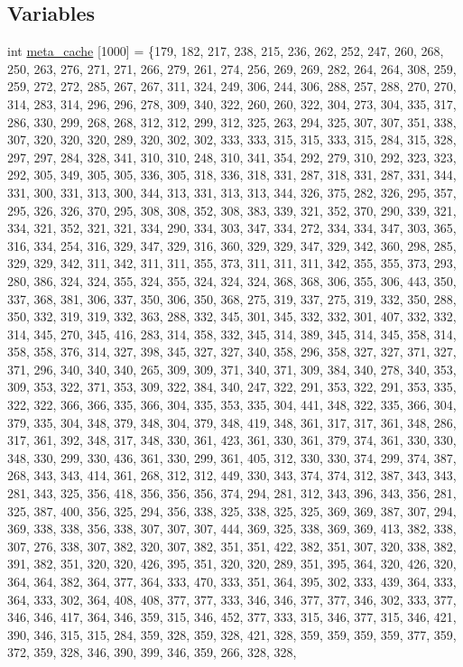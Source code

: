 \subsection*{Variables}
\begin{DoxyCompactItemize}
\item 
int \hyperlink{SphereCollatz_8c_09_09_a3153326b42a60057c079e1910757729a}{meta\-\_\-cache} \mbox{[}1000\mbox{]} = \{179, 182, 217, 238, 215, 236, 262, 252, 247, 260, 268, 250, 263, 276, 271, 271, 266, 279, 261, 274, 256, 269, 269, 282, 264, 264, 308, 259, 259, 272, 272, 285, 267, 267, 311, 324, 249, 306, 244, 306, 288, 257, 288, 270, 270, 314, 283, 314, 296, 296, 278, 309, 340, 322, 260, 260, 322, 304, 273, 304, 335, 317, 286, 330, 299, 268, 268, 312, 312, 299, 312, 325, 263, 294, 325, 307, 307, 351, 338, 307, 320, 320, 320, 289, 320, 302, 302, 333, 333, 315, 315, 333, 315, 284, 315, 328, 297, 297, 284, 328, 341, 310, 310, 248, 310, 341, 354, 292, 279, 310, 292, 323, 323, 292, 305, 349, 305, 305, 336, 305, 318, 336, 318, 331, 287, 318, 331, 287, 331, 344, 331, 300, 331, 313, 300, 344, 313, 331, 313, 313, 344, 326, 375, 282, 326, 295, 357, 295, 326, 326, 370, 295, 308, 308, 352, 308, 383, 339, 321, 352, 370, 290, 339, 321, 334, 321, 352, 321, 321, 334, 290, 334, 303, 347, 334, 272, 334, 334, 347, 303, 365, 316, 334, 254, 316, 329, 347, 329, 316, 360, 329, 329, 347, 329, 342, 360, 298, 285, 329, 329, 342, 311, 342, 311, 311, 355, 373, 311, 311, 311, 342, 355, 355, 373, 293, 280, 386, 324, 324, 355, 324, 355, 324, 324, 324, 368, 368, 306, 355, 306, 443, 350, 337, 368, 381, 306, 337, 350, 306, 350, 368, 275, 319, 337, 275, 319, 332, 350, 288, 350, 332, 319, 319, 332, 363, 288, 332, 345, 301, 345, 332, 332, 301, 407, 332, 332, 314, 345, 270, 345, 416, 283, 314, 358, 332, 345, 314, 389, 345, 314, 345, 358, 314, 358, 358, 376, 314, 327, 398, 345, 327, 327, 340, 358, 296, 358, 327, 327, 371, 327, 371, 296, 340, 340, 340, 265, 309, 309, 371, 340, 371, 309, 384, 340, 278, 340, 353, 309, 353, 322, 371, 353, 309, 322, 384, 340, 247, 322, 291, 353, 322, 291, 353, 335, 322, 322, 366, 366, 335, 366, 304, 335, 353, 335, 304, 441, 348, 322, 335, 366, 304, 379, 335, 304, 348, 379, 348, 304, 379, 348, 419, 348, 361, 317, 317, 361, 348, 286, 317, 361, 392, 348, 317, 348, 330, 361, 423, 361, 330, 361, 379, 374, 361, 330, 330, 348, 330, 299, 330, 436, 361, 330, 299, 361, 405, 312, 330, 330, 374, 299, 374, 387, 268, 343, 343, 414, 361, 268, 312, 312, 449, 330, 343, 374, 374, 312, 387, 343, 343, 281, 343, 325, 356, 418, 356, 356, 356, 374, 294, 281, 312, 343, 396, 343, 356, 281, 325, 387, 400, 356, 325, 294, 356, 338, 325, 338, 325, 325, 369, 369, 387, 307, 294, 369, 338, 338, 356, 338, 307, 307, 307, 444, 369, 325, 338, 369, 369, 413, 382, 338, 307, 276, 338, 307, 382, 320, 307, 382, 351, 351, 422, 382, 351, 307, 320, 338, 382, 391, 382, 351, 320, 320, 426, 395, 351, 320, 320, 289, 351, 395, 364, 320, 426, 320, 364, 364, 382, 364, 377, 364, 333, 470, 333, 351, 364, 395, 302, 333, 439, 364, 333, 364, 333, 302, 364, 408, 408, 377, 377, 333, 346, 346, 377, 377, 346, 302, 333, 377, 346, 346, 417, 364, 346, 359, 315, 346, 452, 377, 333, 315, 346, 377, 315, 346, 421, 390, 346, 315, 315, 284, 359, 328, 359, 328, 421, 328, 359, 359, 359, 359, 377, 359, 372, 359, 328, 346, 390, 399, 346, 359, 266, 328, 328, 
\end{DoxyCompactItemize}
